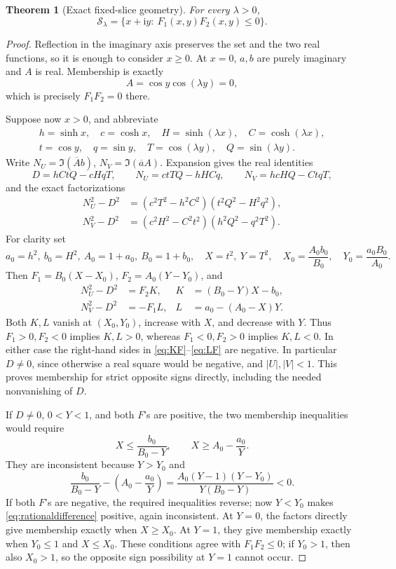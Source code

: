 \documentclass[11pt]{article}
\numberwithin{equation}{section}
\newtheorem{theorem}{Theorem}[section]
\theoremstyle{definition}
\newcommand{\ii}{\mathrm i}
\newcommand{\cS}{\mathcal S}
\begin{document}
\begin{theorem}[Exact fixed-slice geometry]\label{thm:F1F2}
For every \(\lambda>0\),
\begin{equation}\label{eq:F1F2set}
 \boxed{\cS_\lambda=\{x+\ii y:\ F_1(x,y)F_2(x,y)\le0\}.}
\end{equation}
\end{theorem}
\begin{proof}
Reflection in the imaginary axis preserves the set and the two real
functions, so it is enough to consider \(x\ge0\). At \(x=0\),
\(a,b\) are purely imaginary and \(A\) is real. Membership is exactly
\[
 A=\cos y\cos(\lambda y)=0,
\]
which is precisely \(F_1F_2=0\) there.

Suppose now \(x>0\), and abbreviate
\begin{gather*}
 h=\sinh x,\quad c=\cosh x,\quad H=\sinh(\lambda x),\quad C=\cosh(\lambda x),\\
 t=\cos y,\quad q=\sin y,\quad T=\cos(\lambda y),\quad Q=\sin(\lambda y).
\end{gather*}
Write \(N_U=\Im(\overline A b)\), \(N_V=\Im(\overline a A)\).
Expansion gives the real identities
\[
 D=hCtQ-cHqT,\qquad
 N_U=ctTQ-hHCq,\qquad N_V=hcHQ-CtqT,
\]
and the exact factorizations
\begin{align}
 N_U^2-D^2&=(c^2T^2-h^2C^2)(t^2Q^2-H^2q^2),\label{eq:NUfactor}\\
 N_V^2-D^2&=(c^2H^2-C^2t^2)(h^2Q^2-q^2T^2).\label{eq:NVfactor}
\end{align}
For clarity set
\[
 a_0=h^2,\ b_0=H^2,\ A_0=1+a_0,\ B_0=1+b_0,
\quad X=t^2,\ Y=T^2,\quad
 X_0=\frac{A_0b_0}{B_0},\quad Y_0=\frac{a_0B_0}{A_0}.
\]
Then \(F_1=B_0(X-X_0)\), \(F_2=A_0(Y-Y_0)\), and
\begin{align}
 N_U^2-D^2&=F_2 K,& K&=(B_0-Y)X-b_0,\label{eq:KF}\\
 N_V^2-D^2&=-F_1 L,& L&=a_0-(A_0-X)Y.\label{eq:LF}
\end{align}
Both \(K,L\) vanish at \((X_0,Y_0)\), increase with \(X\), and
decrease with \(Y\). Thus \(F_1>0,F_2<0\) implies \(K,L>0\),
whereas \(F_1<0,F_2>0\) implies \(K,L<0\). In either case the
right-hand sides in \eqref{eq:KF}--\eqref{eq:LF} are negative.
In particular \(D\ne0\), since otherwise a real square would be
negative, and \(|U|,|V|<1\). This proves membership for strict
opposite signs directly, including the needed nonvanishing of \(D\).

If \(D\ne0\), \(0<Y<1\), and both \(F\)'s are positive, the
two membership inequalities would require
\[
 X\le\frac{b_0}{B_0-Y},\qquad X\ge A_0-\frac{a_0}{Y}.
\]
They are inconsistent because \(Y>Y_0\) and
\begin{equation}\label{eq:rationaldifference}
 \frac{b_0}{B_0-Y}-\left(A_0-\frac{a_0}{Y}\right)
 =\frac{A_0(Y-1)(Y-Y_0)}{Y(B_0-Y)}<0.
\end{equation}
If both \(F\)'s are negative, the required inequalities reverse;
now \(Y<Y_0\) makes \eqref{eq:rationaldifference} positive, again
inconsistent. At \(Y=0\), the factors directly give membership
exactly when \(X\ge X_0\). At \(Y=1\), they give membership exactly
when \(Y_0\le1\) and \(X\le X_0\). These conditions agree with
\(F_1F_2\le0\); if \(Y_0>1\), then also \(X_0>1\), so the opposite
sign possibility at \(Y=1\) cannot occur.


\end{proof}
\end{document}
